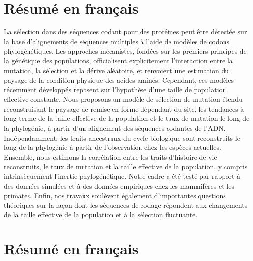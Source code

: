 \thispagestyle{empty}

\section*{Résumé en français}

La sélection dans des séquences codant pour des protéines peut être détectée sur la base d'alignements de séquences multiples à l'aide de modèles de codons phylogénétiques.
Les approches mécanistes, fondées sur les premiers principes de la génétique des populations, officialisent explicitement l'interaction entre la mutation, la sélection et la dérive aléatoire, et renvoient une estimation du paysage de la condition physique des acides aminés.
Cependant, ces modèles récemment développés reposent sur l'hypothèse d'une taille de population effective constante.
Nous proposons un modèle de sélection de mutation étendu reconstruisant le paysage de remise en forme dépendant du site, les tendances à long terme de la taille effective de la population et le taux de mutation le long de la phylogénie, à partir d'un alignement des séquences codantes de l'ADN.
Indépendamment, les traits ancestraux du cycle biologique sont reconstruits le long de la phylogénie à partir de l'observation chez les espèces actuelles.
Ensemble, nous estimons la corrélation entre les traits d'histoire de vie reconstruits, le taux de mutation et la taille effective de la population, y compris intrinsèquement l'inertie phylogénétique.
Notre cadre a été testé par rapport à des données simulées et à des données empiriques chez les mammifères et les primates.
Enfin, nos travaux soulèvent également d'importantes questions théoriques sur la façon dont les séquences de codage répondent aux changements de la taille effective de la population et à la sélection fluctuante.


\section*{Résumé en français}

